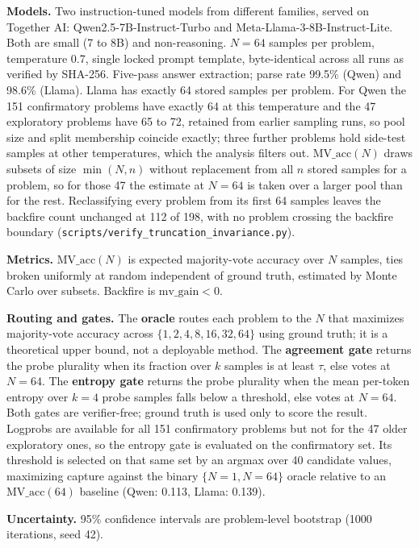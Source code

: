 \documentclass{article}
\begin{document}
\textbf{Models.} Two instruction-tuned models from different families, served
on Together AI: Qwen2.5-7B-Instruct-Turbo and Meta-Llama-3-8B-Instruct-Lite.
Both are small (7 to 8B) and non-reasoning. $N=64$ samples per problem,
temperature 0.7, single locked prompt template, byte-identical across all runs
as verified by SHA-256. Five-pass answer extraction; parse rate 99.5\% (Qwen)
and 98.6\% (Llama). Llama has exactly 64 stored samples per problem. For Qwen
the 151 confirmatory problems have exactly 64 at this temperature and the 47
exploratory problems have 65 to 72, retained from earlier sampling runs, so
pool size and split membership coincide exactly; three further problems hold
side-test samples at other temperatures, which the analysis filters out.
$\text{MV\_acc}(N)$ draws subsets of size $\min(N, n)$ without replacement from
all $n$ stored samples for a problem, so for those 47 the estimate at $N=64$ is
taken over a larger pool than for the rest. Reclassifying every problem from
its first 64 samples leaves the backfire count unchanged at 112 of 198, with no
problem crossing the backfire boundary
(\texttt{scripts/verify\_truncation\_invariance.py}).

\textbf{Metrics.} $\text{MV\_acc}(N)$ is expected majority-vote accuracy over
$N$ samples, ties broken uniformly at random independent of ground truth,
estimated by Monte Carlo over subsets. Backfire is $\text{mv\_gain} < 0$.

\textbf{Routing and gates.} The \textbf{oracle} routes each problem to the
$N$ that maximizes majority-vote accuracy across $\{1,2,4,8,16,32,64\}$ using
ground truth; it is a theoretical upper bound, not a deployable method. The
\textbf{agreement gate} returns the probe plurality when its fraction over $k$
samples is at least $\tau$, else votes at $N=64$. The \textbf{entropy gate}
returns the probe plurality when the mean per-token entropy over $k=4$ probe
samples falls below a threshold, else votes at $N=64$. Both gates are
verifier-free; ground truth is used only to score the result. Logprobs are available for all
151 confirmatory problems but not for the 47 older exploratory ones, so the
entropy gate is evaluated on the confirmatory set. Its threshold is selected
on that same set by an argmax over 40 candidate values, maximizing capture
against the binary $\{N=1, N=64\}$ oracle relative to an
$\text{MV\_acc}(64)$ baseline (Qwen: 0.113, Llama: 0.139).

\textbf{Uncertainty.} 95\% confidence intervals are problem-level bootstrap
(1000 iterations, seed 42).
\end{document}

